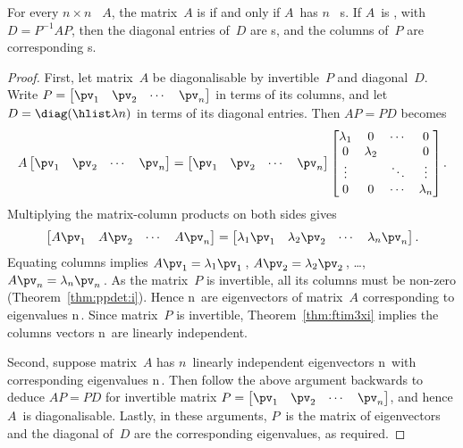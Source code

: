 \begin{theorem} \label{thm:gendiag} 
For every \(n\times n\) ~\(A\), the matrix~\(A\) is  if and only if \(A\)~has \(n\)~ s.  
If \(A\)~is , with  \(D=P^{-1}AP\), then  the diagonal entries of~\(D\) are s, and the columns of~\(P\) are corresponding s.
\end{theorem}
\begin{proof} 
First, let matrix~\(A\) be diagonalisable by invertible~\(P\) and diagonal~\(D\).
Write \(P=\begin{bmatrix} \pv_1&\pv_2&\cdots&\pv_n \end{bmatrix}\) in terms of its columns, and let \(D=\diag(\hlist\lambda n)\) in terms of its diagonal entries.
Then \(AP=PD\) becomes
\begin{equation*}
A\begin{bmatrix} \pv_1&\pv_2&\cdots&\pv_n \end{bmatrix}
=\begin{bmatrix} \pv_1&\pv_2&\cdots&\pv_n \end{bmatrix}
\begin{bmatrix} \lambda_1&0&\cdots&0\\
0&\lambda_2&&0\\
\vdots&&\ddots&\vdots\\
0&0&\cdots&\lambda_n \end{bmatrix}.
\end{equation*}
Multiplying the matrix-column products on both sides gives
\begin{equation*}
\begin{bmatrix} A\pv_1&A\pv_2&\cdots&A\pv_n \end{bmatrix}
=\begin{bmatrix} \lambda_1\pv_1& \lambda_2\pv_2&\cdots& \lambda_n\pv_n \end{bmatrix}.
\end{equation*}
Equating columns implies \(A\pv_1=\lambda_1\pv_1\)\,, \(A\pv_2=\lambda_2\pv_2\)\,, \ldots, \(A\pv_n=\lambda_n\pv_n\)\,.
As the matrix~\(P\) is invertible, all its columns must be non-zero (Theorem~\ref{thm:ppdet:i}).
Hence \hlist\pv n\ are eigenvectors of matrix~\(A\) corresponding to eigenvalues \hlist\lambda n\,.
Since matrix~\(P\) is invertible, Theorem~\ref{thm:ftim3xi} implies the columns vectors \hlist\pv n\ are linearly independent.

Second, suppose matrix~\(A\) has \(n\)~{linearly independent} {eigenvector}s \hlist\pv n\ with corresponding eigenvalues \hlist\lambda n\,.  
Then follow the above argument backwards to deduce \(AP=PD\) for invertible matrix \(P=\begin{bmatrix} \pv_1&\pv_2&\cdots&\pv_n \end{bmatrix}\), and hence \(A\)~is diagonalisable.
Lastly, in these arguments, \(P\)~is the matrix of eigenvectors and the diagonal of~\(D\) are the corresponding eigenvalues, as required.
\end{proof}



